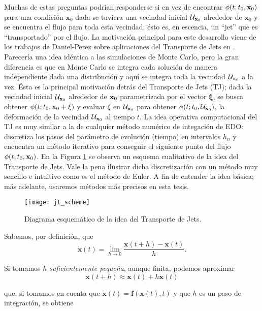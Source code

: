 Muchas de estas preguntas podrían responderse si en vez de encontrar $\phi(t;t_0,\mathbf{x}_0)$ para una condición $\mathbf{x}_0$ dada se tuviera una vecindad inicial $\mathcal{U}_{\mathbf{x}_0}$ alrededor de $\mathbf{x}_0$ y se encuentra el flujo para toda esta vecindad; ésto es, en escencia, un ``jet'' que es ``transportado'' por el flujo. La motivación principal para este desarrollo viene de los trabajos de Daniel-Perez sobre aplicaciones del Transporte de Jets en \cite{Perez2013,Perez2015}. Parecería una idea idéntica a las simulaciones de Monte Carlo, pero la gran diferencia es que en Monte Carlo se integra cada solución de manera independiente dada una distribución y aquí se integra toda la vecindad $\mathcal{U}_{\mathbf{x}_0}$ a la vez. Ésta es la principal motivación detrás del Transporte de Jets (TJ); dada la vecindad inicial $\mathcal{U}_{\mathbf{x}_0}$ alrededor de $\mathbf{x}_0$ parametrizada por el vector $\mathbf{\xi}$, se busca obtener $\phi(t;t_0,\mathbf{x}_0 + \xi)$ y evaluar $\xi$ en $\mathcal{U}_{\mathbf{x}_0}$ para obtener $\phi(t;t_0,\mathcal{U}_{\mathbf{x}_0} )$, la deformación de la vecindad $\mathcal{U}_{\mathbf{x}_0}$ al tiempo $t$. La idea operativa computacional del TJ es muy similar a la de cualquier método numérico de integación de EDO: discretiza los pasos del parámetro de evolución (tiempo) en intervalos $h_n$ y encuentra un método iterativo para conseguir el siguiente punto del flujo $\phi(t;t_0,\mathbf{x}_0)$. En la Figura \ref{fig:jt_scheme} se observa un esquema cualitativo de la idea del Transporte de Jets. Vale la pena ilustrar dicha discretización con un método muy sencillo e intuitivo como es el método de Euler. A fin de entender la idea básica; más adelante, usaremos métodos más precisos en esta tesis.


\begin{figure}[h!]
 \centering
 \texttt{[image: jt\_scheme]}
 \caption{Diagrama esquemático de la idea del Transporte de Jets.}
 \label{fig:jt_scheme}
\end{figure}

Sabemos, por definición, que 
\begin{equation*}
 \dot{\mathbf{x}}(t) = \lim_{h\to 0} \frac{\mathbf{x}(t+h)-\mathbf{x}(t)}{h}.
\end{equation*}  

Si tomamos $h$ \textit{suficientemente pequeña}, aunque finita, podemos aproximar
\begin{equation*}
 \mathbf{x}(t+h) \approx \mathbf{x}(t) + h \dot{\mathbf{x}}(t)
\end{equation*}

que, si tomamos en cuenta que $\dot{\mathbf{x}}(t) = \mathbf{f}(\mathbf{x}(t),t)$ y que $h$ es un paso de integración, se obtiene
 
